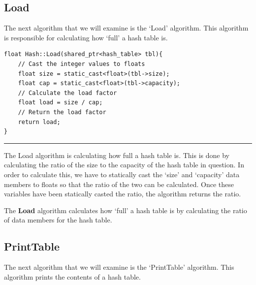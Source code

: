 \documentclass[a4paper,9pt]{article}
\newcommand{\horizontalline}{\noindent \rule{\textwidth}{0.5pt}\par}
\begin{document}
\subsection*{Load}

The next algorithm that we will examine is the `Load' algorithm. This algorithm is responsible for calculating how `full' a hash table is.

\begin{highlight}

\begin{verbatim}
float Hash::Load(shared_ptr<hash_table> tbl){
    // Cast the integer values to floats
    float size = static_cast<float>(tbl->size);
    float cap = static_cast<float>(tbl->capacity);
    // Calculate the load factor
    float load = size / cap;
    // Return the load factor
    return load;
}
\end{verbatim}

\horizontalline

The Load algorithm is calculating how full a hash table is. This is done by calculating the ratio of the size to the capacity of the hash table in question. In order to calculate this, we have to statically cast
the `size' and `capacity' data members to floats so that the ratio of the two can be calculated. Once these variables have been statically casted the ratio, the algorithm returns the ratio.

\end{highlight}

\noindent The \textbf{Load} algorithm calculates how `full' a hash table is by calculating the ratio of data members for the hash table.

\subsection*{PrintTable}

The next algorithm that we will examine is the `PrintTable' algorithm. This algorithm prints the contents of a hash table.
\end{document}
